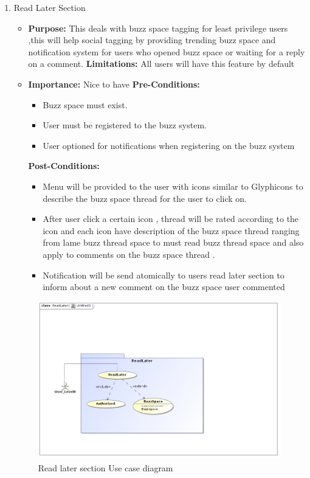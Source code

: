 \documentclass[11pt]{article}
\begin{document}
\begin{enumerate}
\item Read Later Section
\begin{itemize}
\item \textbf{Purpose:}
This deals with buzz space tagging for least privilege users
,this will help social tagging by providing trending buzz space and
notification system for users who opened buzz space or waiting for a
reply on a comment.
\newline
\textbf{Limitations:} 
All users will have this feature by default

\item \textbf{Importance:} Nice to have\newline
\textbf{Pre-Conditions: }
	\begin{itemize}
	\item Buzz space must exist.
	\item User must be registered to the buzz system.
	\item User optioned for notifications when registering on the buzz system

	\end{itemize}

\textbf{Post-Conditions: }
	\begin{itemize}
	\item Menu will be provided to the user with icons similar to Glyphicons
to describe the buzz space thread for the user to click on.
	\item After user click a certain icon , thread will be rated according to
the icon and each icon have description of the buzz space thread
ranging from lame buzz thread space to must read buzz thread
space and also apply to comments on the buzz space thread .
\item Notification will be send atomically to users read later section to
inform about a new comment on the buzz space user commented
	
	\end{itemize}
\end{itemize}

\begin{figure}[H]	
\graphicspath{ {../Diagrams/sfiso/} }
    	\includegraphics[scale=0.5]{read.jpg}
    	\caption{Read later section Use case diagram}
	\end{figure}


\end{enumerate}
\end{document}
